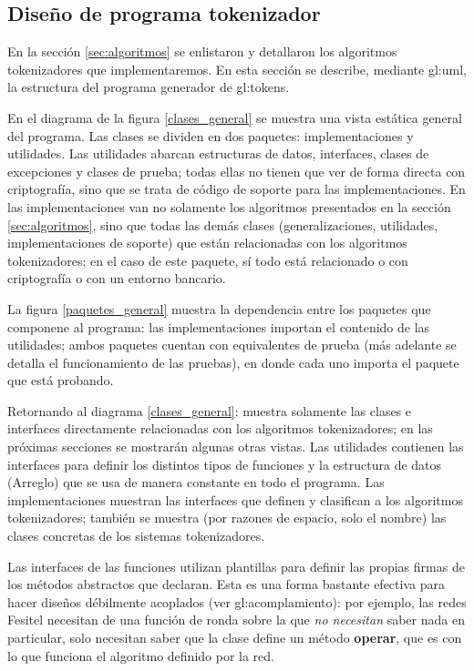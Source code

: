 %
%

\subsection{Diseño de programa tokenizador}

En la sección \ref{sec:algoritmos} se enlistaron y detallaron los algoritmos
tokenizadores que implementaremos. En esta sección se describe, mediante
\gls{gl:uml}, la estructura del programa generador de \glspl{gl:token}.

En el diagrama de la figura \ref{clases_general} se muestra una vista estática
general del programa. Las clases se dividen en dos paquetes: implementaciones
y utilidades. Las utilidades abarcan estructuras de datos, interfaces,
clases de excepciones y clases de prueba; todas ellas no tienen que ver
de forma directa con criptografía, sino que se trata de código de soporte
para las implementaciones. En las implementaciones van no solamente
los algoritmos presentados en la sección \ref{sec:algoritmos}, sino que todas
las demás clases (generalizaciones, utilidades, implementaciones de
soporte) que están relacionadas con los algoritmos tokenizadores; en el caso
de este paquete, sí todo está relacionado o con criptografía o con un
entorno bancario.

La figura \ref{paquetes_general} muestra la dependencia entre los paquetes que
componene al programa: las implementaciones importan el contenido de las
utilidades; ambos paquetes cuentan con equivalentes de prueba (más adelante se
detalla el funcionamiento de las pruebas), en donde cada uno importa el paquete
que está probando.

Retornando al diagrama \ref{clases_general}: muestra solamente las clases
e interfaces directamente relacionadas con los algoritmos tokenizadores;
en las próximas secciones se mostrarán algunas otras vistas. Las utilidades
contienen las interfaces para definir los distintos tipos de funciones y la
estructura de datos (Arreglo) que se usa de manera constante en todo el
programa. Las implementaciones muestran las interfaces que definen y clasifican
a los algoritmos tokenizadores; también se muestra (por razones de espacio,
solo el nombre) las clases concretas de los sistemas tokenizadores.

Las interfaces de las funciones utilizan plantillas para definir las propias
firmas de los métodos abstractos que declaran. Esta es una forma bastante
efectiva para hacer diseños débilmente acoplados (ver
\gls{gl:acomplamiento}): por ejemplo, las redes Fesitel necesitan
de una función de ronda sobre la que \textit{no necesitan} saber nada en
particular, solo necesitan saber que la clase define un método \textbf{operar},
que es con lo que funciona el algoritmo definido por la red.

